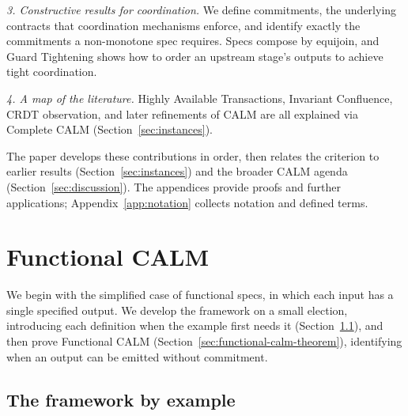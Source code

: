 \documentclass[sigconf]{cidr-2027}
\theoremstyle{remark}
\newcommand{\commitment}{commitment\xspace}
\newcommand{\commitments}{commitments\xspace}
\begin{document}
\textcolor{reviewed}{\noindent
\emph{3. Constructive results for coordination.} We define \commitments,
        the underlying contracts that coordination mechanisms enforce,
        and identify exactly the \commitments a non-monotone spec requires.} \textcolor{reviewed}{Specs compose by equijoin, and Guard Tightening shows how to order an
        upstream stage's outputs to achieve tight coordination.}

\textcolor{reviewed}{\noindent
\emph{4. A map of the literature.} Highly Available Transactions, Invariant
        Confluence, CRDT observation, and later refinements of CALM are all
        explained via Complete CALM (Section~\ref{sec:instances}).}

\vspace{0.5em}
\noindent
The paper develops these contributions in order, then relates the criterion to
earlier results (Section~\ref{sec:instances}) and the broader CALM agenda
(Section~\ref{sec:discussion}). The appendices provide proofs and further
applications; Appendix~\ref{app:notation} collects notation and defined terms.

\section{Functional CALM}
\label{sec:functional-calm}

\textcolor{reviewed}{We begin with the simplified case of functional specs, in which each input has a
single specified output.} \textcolor{reviewed}{We develop the framework on a small election,
introducing each definition when the example first needs it
(Section~\ref{sec:election-story}), and then prove Functional CALM
(Section~\ref{sec:functional-calm-theorem}), identifying when an output can be
emitted without \commitment.}

\subsection{The framework by example}
\label{sec:election-story}
\label{sec:functional-specifications}
\label{sec:functional-events}
\label{sec:executions}
\end{document}
